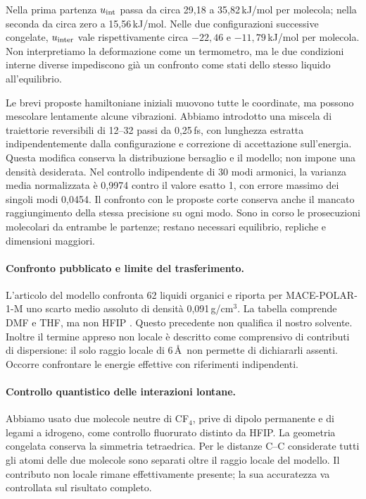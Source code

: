 \documentclass[11pt,reqno]{amsart}
\numberwithin{equation}{section}
\begin{document}
Nella prima partenza $u_{\rm int}$ passa da circa 29,18 a
35,82\,kJ/mol per molecola; nella seconda da circa zero a
15,56\,kJ/mol. Nelle due configurazioni successive congelate,
$u_{\rm inter}$ vale rispettivamente circa $-22,46$ e
$-11,79$\,kJ/mol per molecola. Non interpretiamo la deformazione
come un termometro, ma le due condizioni interne diverse
impediscono gi\`a un confronto come stati dello stesso liquido
all'equilibrio.

Le brevi proposte hamiltoniane iniziali muovono tutte le
coordinate, ma possono mescolare lentamente alcune vibrazioni.
Abbiamo introdotto una miscela di traiettorie reversibili di
12--32 passi da 0,25\,fs, con lunghezza estratta indipendentemente
dalla configurazione e correzione di accettazione sull'energia.
Questa modifica conserva la distribuzione bersaglio e il modello;
non impone una densit\`a desiderata. Nel controllo indipendente
di 30 modi armonici, la varianza media normalizzata \`e 0,9974
contro il valore esatto 1, con errore massimo dei singoli modi
0,0454. Il confronto con le proposte corte conserva anche
il mancato raggiungimento della stessa precisione su ogni modo.
Sono in corso le prosecuzioni molecolari da entrambe le partenze;
restano necessari equilibrio, repliche e dimensioni maggiori.

\paragraph{Confronto pubblicato e limite del trasferimento.}
L'articolo del modello confronta 62 liquidi organici e riporta
per MACE-POLAR-1-M uno scarto medio assoluto di densit\`a
0,091\,g/cm$^3$. La tabella comprende DMF e THF, ma non HFIP
\cite{MACEPolar2026}. Questo precedente non qualifica il nostro
solvente. Inoltre il termine appreso non locale \`e descritto
come comprensivo di contributi di dispersione: il solo raggio
locale di 6\,\AA\ non permette di dichiararli assenti. Occorre
confrontare le energie effettive con riferimenti indipendenti.

\paragraph{Controllo quantistico delle interazioni lontane.}
Abbiamo usato due molecole neutre di CF$_4$, prive di dipolo
permanente e di legami a idrogeno, come controllo fluorurato
distinto da HFIP. La geometria congelata conserva la simmetria
tetraedrica. Per le distanze C--C considerate tutti gli atomi
delle due molecole sono separati oltre il raggio locale del
modello. Il contributo non locale rimane effettivamente presente;
la sua accuratezza va controllata sul risultato completo.
\end{document}
